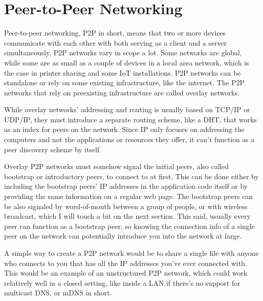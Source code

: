 \chapter{Peer-to-Peer Networking}
\label{Peer-to-Peer Networking}
Peer-to-peer networking, P2P in short, means that two or more devices communicate with each other with both serving as a client and a server simultaneously. P2P networks vary in scope a lot. Some networks are global, while some are as small as a couple of devices in a local area network, which is the case in printer sharing and some IoT installations. P2P networks can be standalone or rely on some existing infrastructure, like the internet. The P2P networks that rely on preexisting infrastructure are called overlay networks.

While overlay networks' addressing and routing is usually based on TCP/IP or UDP/IP, they must introduce a separate routing scheme, like a DHT, that works as an index for peers on the network. Since IP only focuses on addressing the computers and not the applications or resources they offer, it can't function as a peer discovery scheme by itself.

Overlay P2P networks must somehow signal the initial peers, also called bootstrap or introductory peers, to connect to at first. This can be done either by including the bootstrap peers' IP addresses in the application code itself or by providing the same information on a regular web page. The bootstrap peers can be also signaled by word-of-mouth between a group of people, or with wireless broadcast, which I will touch a bit on the next section. This said, usually every peer can function as a bootstrap peer, so knowing the connection info of a single peer on the network can potentially introduce you into the network at large.

A simple way to create a P2P network would be to share a single file with anyone who connects to you that has all the IP addresses you've ever connected with. This would be an example of an unstructured P2P network, which could work relatively well in a closed setting, like inside a LAN if there's no support for multicast DNS, or mDNS in short.

